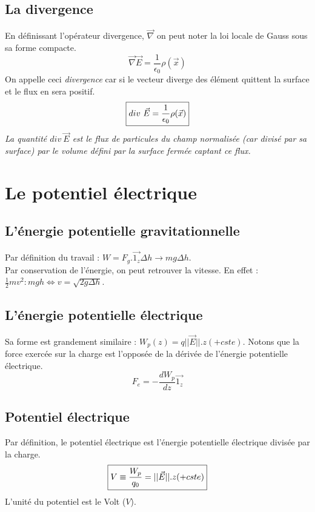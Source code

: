 \documentclass	[11pt, a4paper, openany]{book}
\begin{document}
\subsection{La divergence}
En définissant l'opérateur divergence, $\vec{\nabla}$ on peut noter la loi locale de Gauss sous sa forme compacte.
\begin{equation}
\vec{\nabla}\vec{E} = \frac{1}{\epsilon_0}\rho(\vec x)
\end{equation}
On appelle ceci \textit{divergence} car si le vecteur diverge des élément quittent la surface et le flux en sera positif.
\begin{equation}
\fbox{$div\ \vec{E} = \dfrac{1}{\epsilon_0}\rho(\vec{x})$}
\end{equation}
\textit{La quantité $div\ \vec{E}$ est le flux de particules du champ normalisée (car divisé par sa surface) par le volume défini par la surface fermée captant ce flux.}


\section{Le potentiel électrique}
\subsection{L'énergie potentielle gravitationnelle}
Par définition du travail : $W = F_g.\vec{1_z}\Delta h \rightarrow mg\Delta h$.\\
Par conservation de l'énergie, on peut retrouver la vitesse. En effet : $\frac{1}{2}mv^2 : mgh \Leftrightarrow v = \sqrt{2g\Delta h}$.

\subsection{L'énergie potentielle électrique}
Sa forme est grandement similaire : $W_p(z) = q||\vec{E}||.z (+cste)$. Notons que la force exercée sur la charge est l'opposée de la dérivée de l'énergie potentielle électrique.
\begin{equation}
F_e = - \frac{dW_p}{dz}\vec{1_z}
\end{equation}

\subsection{Potentiel électrique}
Par définition, le potentiel électrique est l'énergie potentielle électrique divisée par la charge.
\begin{equation}
\fbox{$V \equiv \dfrac{W_p}{q_0} = ||\vec E||.z (+cste)$}
\end{equation}
L'unité du potentiel est le Volt ($V$).
\end{document}
